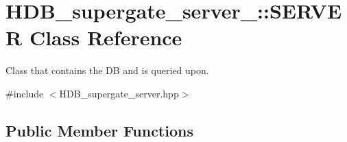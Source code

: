 \hypertarget{classHDB__supergate__server___1_1SERVER}{}\section{H\+D\+B\+\_\+supergate\+\_\+server\+\_\+\+:\+:S\+E\+R\+V\+ER Class Reference}
\label{classHDB__supergate__server___1_1SERVER}


Class that contains the DB and is queried upon.  




{\ttfamily \#include $<$H\+D\+B\+\_\+supergate\+\_\+server.\+hpp$>$}

\subsection*{Public Member Functions}
